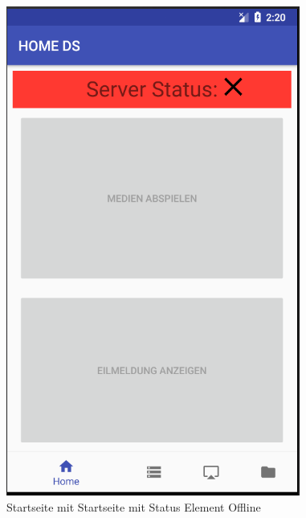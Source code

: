 \begin{figure}[H]
\centering
\includegraphics[scale=0.35]{images/06_AndroidApp/06_StatusOffline}
\caption{Startseite mit Startseite mit Status Element Offline}
\label{fig:mediaNav}
\end{figure}
\\
